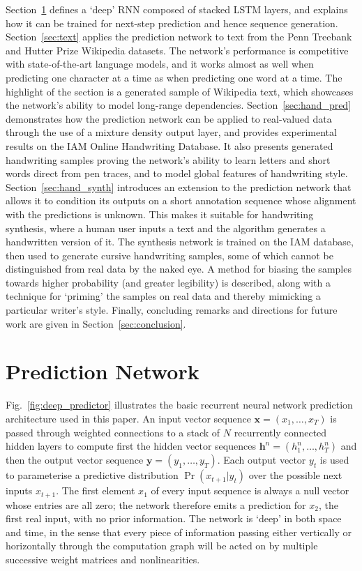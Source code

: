 Section~\ref{sec:pred_net} defines a `deep' RNN composed of stacked LSTM layers, and explains how it can be trained for next-step prediction and hence sequence generation.
Section~\ref{sec:text} applies the prediction network to text from the Penn Treebank and Hutter Prize Wikipedia datasets. The network's performance is competitive with state-of-the-art language models, and it works almost as well when predicting one character at a time as when predicting one word at a time. The highlight of the section is a generated sample of Wikipedia text, which showcases the network's ability to model long-range dependencies.
Section~\ref{sec:hand_pred} demonstrates how the prediction network can be applied to real-valued data through the use of a mixture density output layer, and provides experimental results on the IAM Online Handwriting Database. It also presents generated handwriting samples proving the network's ability to learn letters and short words direct from pen traces, and to model global features of handwriting style.
Section~\ref{sec:hand_synth} introduces an extension to the prediction network that allows it to condition its outputs on a short annotation sequence whose alignment with the predictions is unknown. This makes it suitable for handwriting synthesis, where a human user inputs a text and the algorithm generates a handwritten version of it. The synthesis network is trained on the IAM database, then used to generate cursive handwriting samples, some of which cannot be distinguished from real data by the naked eye. A method for biasing the samples towards higher probability (and greater legibility) is described, along with a technique for `priming' the samples on real data and thereby mimicking a particular writer's style. Finally, concluding remarks and directions for future work are given in Section~\ref{sec:conclusion}.

\section{Prediction Network}
\label{sec:pred_net}
Fig.~\ref{fig:deep_predictor} illustrates the basic recurrent neural network prediction architecture used in this paper. An input vector sequence $\mathbf{x} = (x_1,\ldots,x_T)$ is passed through weighted connections to a stack of $N$ recurrently connected hidden layers to compute first the hidden vector sequences $\mathbf{h}^n = (h^n_1,\ldots,h^n_T)$ and then the output vector sequence $\mathbf{y} = (y_1,\ldots,y_T)$.
Each output vector $y_t$ is used to parameterise a predictive distribution $\Pr(x_{t+1}|y_t)$ over the possible next inputs $x_{t+1}$. The first element $x_1$ of every input sequence is always a null vector whose entries are all zero; the network therefore emits a prediction for $x_2$, the first real input, with no prior information. The network is `deep' in both space and time, in the sense that every piece of information passing either vertically or horizontally through the computation graph will be acted on by multiple successive weight matrices and nonlinearities.

